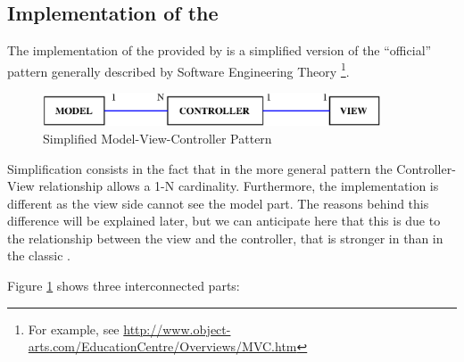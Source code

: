 \subsection{\label{MVC} Implementation of the \mvc}

The implementation of the \mvc provided by \pygtkmvc is a simplified
version of the ``official'' pattern generally described by Software
Engineering Theory \footnote{For example, see
  \url{http://www.object-arts.com/EducationCentre/Overviews/MVC.htm}}.

\begin{figure}[htbp]
\begin{center}
\includegraphics[width=10cm]{eps/mvc.eps}
\caption{\label{MVC_f}Simplified Model-View-Controller Pattern}
\end{center}
\end{figure}
Simplification consists in the fact that in the more general pattern
the Controller-View relationship allows a 1-N cardinality.
Furthermore, the implementation is different as the view side cannot
see the model part. The reasons behind this difference will be
explained later, but we can anticipate here that this is due to the
relationship between the view and the controller, that is stronger in
\pygtkmvc than in the classic \mvc.

\smallskip

Figure \ref{MVC_f} shows three interconnected parts:

